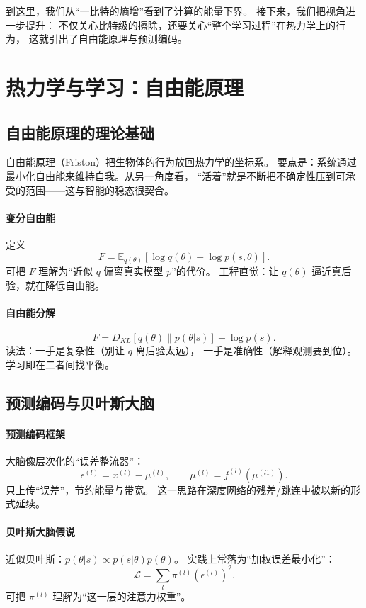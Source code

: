 到这里，我们从“一比特的熵增”看到了计算的能量下界。  
接下来，我们把视角进一步提升：  
不仅关心比特级的擦除，还要关心“整个学习过程”在热力学上的行为，  
这就引出了自由能原理与预测编码。

\section{热力学与学习：自由能原理}

\subsection{自由能原理的理论基础}

自由能原理（Friston）把生物体的行为放回热力学的坐标系。  
要点是：系统通过最小化自由能来维持自我。从另一角度看，  
“活着”就是不断把不确定性压到可承受的范围——这与智能的稳态很契合。

\paragraph{变分自由能}
定义
$$F=\mathbb{E}_{q(\theta)}[\log q(\theta)-\log p(s,\theta)].$$
可把 $F$ 理解为“近似 $q$ 偏离真实模型 $p$”的代价。  
工程直觉：让 $q(\theta)$ 逼近真后验，就在降低自由能。

\paragraph{自由能分解}
$$F=D_{KL}[q(\theta)\|p(\theta|s)]-\log p(s).$$
读法：一手是复杂性（别让 $q$ 离后验太远），  
一手是准确性（解释观测要到位）。学习即在二者间找平衡。

\subsection{预测编码与贝叶斯大脑}

\paragraph{预测编码框架}
大脑像层次化的“误差整流器”：  
$$\epsilon^{(l)}=x^{(l)}-\mu^{(l)},\qquad \mu^{(l)}=f^{(l)}(\mu^{(l1)}).$$
只上传“误差”，节约能量与带宽。
这一思路在深度网络的残差/跳连中被以新的形式延续。

\paragraph{贝叶斯大脑假说}
近似贝叶斯：$p(\theta|s)\propto p(s|\theta)p(\theta)$。  
实践上常落为“加权误差最小化”：
$$\mathcal{L}=\sum_l \pi^{(l)}(\epsilon^{(l)})^2.$$
可把 $\pi^{(l)}$ 理解为“这一层的注意力权重”。


